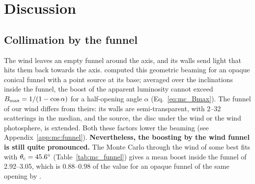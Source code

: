 
\section{Discussion}
\label{sec:discussion}



\subsection{Collimation by the funnel}
\label{sec:disc:funnel}

The wind leaves an empty funnel around the axis, and its walls send light that hits them back towards the axis.
\citet{Ahlberg2026} computed this geometric beaming for an opaque conical funnel with a point source at its base; averaged over the inclinations inside the funnel, the boost of the apparent luminosity cannot exceed $B_{\rm max} = 1/(1 - \cos\alpha)$ for a half-opening angle $\alpha$ (Eq.~\ref{eq:mc_Bmax}).
The funnel of our wind differs from theirs: its walls are semi-transparent, with 2--32 scatterings in the median, and the source, the disc under the wind or the wind photosphere, is extended. Both these factors lower the beaming (see Appendix~\ref{app:mc:funnel}).
\textbf{Nevertheless, the boosting by the wind funnel is still quite pronounced.} The Monte Carlo through the wind of some best fits with $\theta_{\rm c} = 45.6^\circ$ (Table~\ref{tab:mc_funnel}) gives a mean boost inside the funnel of 2.92--3.05, which is 0.88--0.98 of the value for an opaque funnel of the same opening by \citet{Ahlberg2026}.

